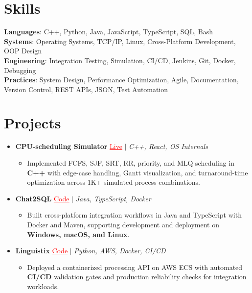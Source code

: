 \documentclass[letterpaper,10pt]{article}
\newcommand{\resumeItem}[1]{\item\small{{#1 \vspace{-2pt}}}}
\newcommand{\resumeProjectHeading}[1]{\item \small #1 \vspace{-2pt}}
\newcommand{\resumeSubHeadingListStart}{\begin{itemize}[leftmargin=0.0in, label={}]}
\newcommand{\resumeSubHeadingListEnd}{\end{itemize}}
\newcommand{\resumeProjItemListStart}{\begin{itemize}[leftmargin=0.15in,label=\textbullet,itemsep=0pt,topsep=0pt,parsep=0pt,partopsep=0pt]}
\newcommand{\resumeProjItemListEnd}{\end{itemize}\vspace{-4pt}}
\begin{document}
\section{Skills}
\begin{itemize}[leftmargin=0.15in, label={}]
\small{\item{
\textbf{Languages}: C++, Python, Java, JavaScript, TypeScript, SQL, Bash \\
\textbf{Systems}: Operating Systems, TCP/IP, Linux, Cross-Platform Development, OOP Design \\
\textbf{Engineering}: Integration Testing, Simulation, CI/CD, Jenkins, Git, Docker, Debugging \\
\textbf{Practices}: System Design, Performance Optimization, Agile, Documentation, Version Control, REST APIs, JSON, Test Automation
}}
\end{itemize}
\vspace{-6pt}
\section{Projects}
\resumeSubHeadingListStart
\vspace{-2pt}
\resumeProjectHeading{\textbf{CPU-scheduling Simulator} {\href{https://cpu-scheduler-amber.vercel.app/}{\textcolor{red}{\underline{Live}}}} $|$ \emph{C++, React, OS Internals}}
\resumeProjItemListStart
\resumeItem{Implemented FCFS, SJF, SRT, RR, priority, and MLQ scheduling in \textbf{C++} with edge-case handling, Gantt visualization, and turnaround-time optimization across 1K+ simulated process combinations.}
\resumeProjItemListEnd
\vspace{3pt}
\resumeProjectHeading{\textbf{Chat2SQL} {\href{https://github.com/SAHAJ-BHADJA/Chat2SQL}{\textcolor{red}{\underline{Code}}}} $|$ \emph{Java, TypeScript, Docker}}
\resumeProjItemListStart
\resumeItem{Built cross-platform integration workflows in Java and TypeScript with Docker and Maven, supporting development and deployment on \textbf{Windows, macOS, and Linux}.}
\resumeProjItemListEnd
\vspace{3pt}
\resumeProjectHeading{\textbf{Linguistix} {\href{https://github.com/SAHAJ-BHADJA/Linguistix}{\textcolor{red}{\underline{Code}}}} $|$ \emph{Python, AWS, Docker, CI/CD}}
\resumeProjItemListStart
\resumeItem{Deployed a containerized processing API on AWS ECS with automated \textbf{CI/CD} validation gates and production reliability checks for integration workloads.}
\resumeProjItemListEnd
\resumeSubHeadingListEnd
\end{document}
